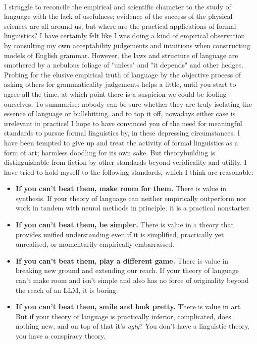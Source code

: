 \\
I struggle to reconcile the empirical and scientific character to the study of language with the lack of usefulness; evidence of the success of the physical sciences are all around us, but where are the practical applications of formal linguistics? I have certainly felt like I was doing a kind of empirical observation by consulting my own acceptability judgements and intuitions when constructing models of English grammar. However, the laws and structure of language are smothered by a nebulous foliage of "unless" and "it depends" and other hedges. Probing for the elusive empirical truth of language by the objective process of asking others for grammaticality judgements helps a little, until you start to agree all the time, at which point there is a suspicion we could be fooling ourselves. To summarise: nobody can be sure whether they are truly isolating the essence of language or bullshitting, and to top it off, nowadays either case is irrelevant in practice! I hope to have convinced you of the need for meaningful standards to pursue formal linguistics by, in these depressing circumstances. I have been tempted to give up and treat the activity of formal linguistics as a form of art; harmless doodling for its own sake. But theorybuilding is distinguishable from fiction by other standards beyond veridicality and utility. I have tried to hold myself to the following standards, which I think are reasonable:
\begin{itemize}
\item{\textbf{If you can't beat them, make room for them.} There is value in synthesis. If your theory of language can neither empirically outperform nor work in tandem with neural methods in principle, it is a practical nonstarter.}
\item{\textbf{If you can't beat them, be simpler.} There is value in a theory that provides unified understanding even if it is simplified, practically yet unrealised, or momentarily empirically embarrassed.}
\item{\textbf{If you can't beat them, play a different game.} There is value in breaking new ground and extending our reach. If your theory of language can't make room and isn't simple and also has no force of originality beyond the reach of an LLM, it is boring.}
\item{\textbf{If you can't beat them, smile and look pretty.} There is value in art. But if your theory of language is practically inferior, complicated, does nothing new, and on top of that it's \emph{ugly}? You don't have a linguistic theory, you have a conspiracy theory.}
\end{itemize}

